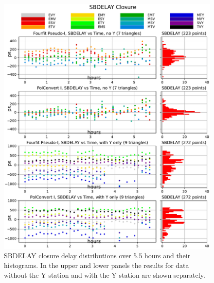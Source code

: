 \documentclass[letterpaper,twoside,12pt]{article}
\begin{document}
\begin{figure}[ht!]
  \begin{center}
  \includegraphics[width=40pc]{SBDELAY_Closure_Delay_Y_no_Y.pdf}
  \caption{\small SBDELAY closure delay distributions over 5.5 hours and their histograms. In the upper and lower panels the results for data without the Y station and with the Y station are shown separately.}
  \label{sbdYnY}
  \end{center}
\end{figure}
\end{document}
